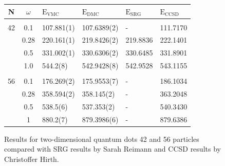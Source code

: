 \begin{frame}

\begin{figure}
 \begin{center}
 \footnotesize
 \begin{tabular}{cc|llll}
 N      &  $\omega$ & $\mathrm{E_{VMC}}$ & $\mathrm{E_{DMC}}$ & $\mathrm{E_{SRG}}$ & $\mathrm{E_{CCSD}}$\\
\hline\hline
\multicolumn{6}{c}{} \\
    42    &   0.1    & 107.881(1)  & 107.6389(2) &- 			& 111.7170  \\
          &   0.28   & 220.161(1)  & 219.8426(2) &219.8836 	& 222.1401  \\
          &   0.5    & 331.002(1)  & 330.6306(2) &330.6485	& 331.8901  \\
          &   1.0    & 544.2(8)    & 542.9428(8) &542.9528 	& 543.1155 \\
\cline{2-6}
\multicolumn{6}{c}{} \\
    56    &   0.1    & 176.269(2) & 175.9553(7)  & -		& 186.1034 \\
          &   0.28   & 358.594(2) & 358.145(2)   & -		& 363.2048  \\
          &   0.5    & 538.5(6)   & 537.353(2)   & -		& 540.3430 \\
          &   1      & 880.2(7)   & 879.3986(6)  & -		& 879.6386 \\
\cline{2-6}
 \end{tabular}  
 \end{center}
  \caption{Results for two-dimensional quantum dots 42 and 56 particles compared with SRG results by Sarah Reimann and CCSD results by Christoffer Hirth.}
\end{figure}
\end{frame}

\normalsize

